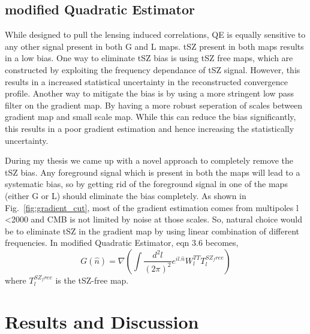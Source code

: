 \subsection{modified Quadratic Estimator}
While designed to pull the lensing induced correlations, QE is equally sensitive to any other signal present in both G and L maps.
 tSZ present in both maps results in a low bias.
 One way to eliminate tSZ bias is using tSZ free maps, which are constructed by exploiting the frequency dependance of tSZ signal.
 However, this results in a increased statistical uncertainty in the reconstructed convergence profile.
 Another way to mitigate the bias is by using a more stringent low pass filter on the gradient map. %
 By having a more robust seperation of scales between gradient map and small scale map.
 While this can reduce the bias significantly, this results in a poor gradient estimation and hence increasing the statistically uncertainty.

 
 During my thesis we came up with a novel approach to completely remove the tSZ bias. 
 Any foreground signal which is present in both the maps will lead to a systematic bias, so by getting rid of the foreground signal in one of the maps (either G or L) should eliminate the bias completely.
  As shown in Fig.~\ref{fig:gradient_cut}, most of the gradient estimation comes from multipoles l <2000 and CMB is not limited by noise at those scales.
  So, natural choice would be to eliminate tSZ in the gradient map by using linear combination of different frequencies. 
  In modified Quadratic Estimator, eqn 3.6 becomes,
  \begin{equation}
   G(\hat{n}) = \nabla (\int\frac{d^{2}l}{(2\pi)^{2}} e^{il .\hat{n}} W^{TT}_{l} T^{SZ_free}_{l}   )
  \end{equation}
  where $T^{SZ_free}_{l} $ is the tSZ-free map.
  \section{Results and Discussion}\label{sec_results}

